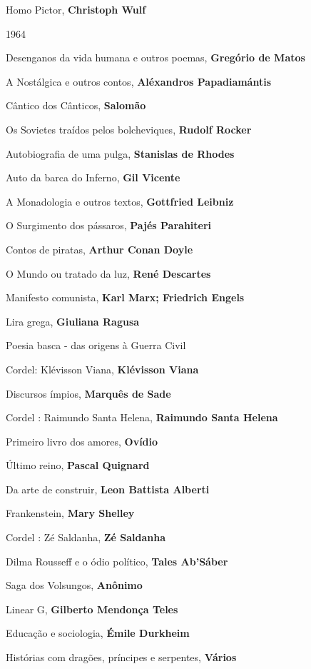 \begin{multicols}{2}
\begin{enumerate}
{\item Homo Pictor, \textbf{Christoph Wulf}
\item 1964
\item Desenganos da vida humana e outros poemas, \textbf{Gregório de Matos}
\item A Nostálgica e outros contos, \textbf{Aléxandros Papadiamántis}
\item Cântico dos Cânticos, \textbf{Salomão}
\item Os Sovietes traídos pelos bolcheviques, \textbf{Rudolf Rocker}
\item Autobiografia de uma pulga, \textbf{Stanislas de Rhodes}
\item Auto da barca do Inferno, \textbf{Gil Vicente}
\item A Monadologia e outros textos, \textbf{Gottfried Leibniz}
\item O Surgimento dos pássaros, \textbf{Pajés Parahiteri}
\item Contos de piratas, \textbf{Arthur Conan Doyle}
\item O Mundo ou tratado da luz, \textbf{René Descartes}
\item Manifesto comunista, \textbf{Karl Marx; Friedrich Engels}
\item Lira grega, \textbf{Giuliana Ragusa}
\item Poesia basca - das origens à Guerra Civil
\item Cordel: Klévisson Viana, \textbf{Klévisson Viana}
\item Discursos ímpios, \textbf{Marquês de Sade}
\item Cordel : Raimundo Santa Helena, \textbf{Raimundo Santa Helena}
\item Primeiro livro dos amores, \textbf{Ovídio}
\item Último reino, \textbf{Pascal Quignard}
\item Da arte de construir, \textbf{Leon Battista Alberti}
\item Frankenstein, \textbf{Mary Shelley}
\item Cordel : Zé Saldanha, \textbf{Zé Saldanha}
\item Dilma Rousseff e o ódio político, \textbf{Tales Ab'Sáber}
\item Saga dos Volsungos, \textbf{Anônimo}
\item Linear G, \textbf{Gilberto Mendonça Teles}
\item Educação e sociologia, \textbf{Émile Durkheim}
\item Histórias com dragões, príncipes e serpentes, \textbf{Vários}
}
\end{enumerate}
\end{multicols}
